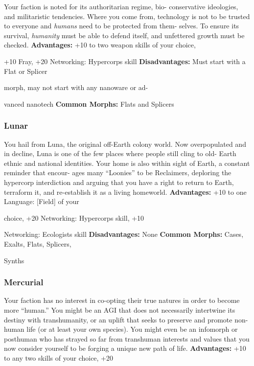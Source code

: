 Your faction is noted for its authoritarian regime, bio-
conservative ideologies, and militaristic tendencies. 
Where you come from, technology is not to be trusted to 
everyone and \textit{humans} need to be protected from them-
selves. To ensure its survival, \textit{humanity }must be able to 
defend itself, and unfettered growth must be checked.
\textbf{Advantages:} +10 to two weapon skills of your choice, 

+10 Fray, +20 Networking: Hypercorps skill
\textbf{Disadvantages:} Must start with a Flat or Splicer 

morph, may not start with any nanoware or ad-

vanced nanotech
\textbf{Common Morphs:} Flats and Splicers

\subsubsection{Lunar}

You hail from Luna, the original off-Earth colony 
world. Now overpopulated and in decline, Luna is 
one of the few places where people still cling to old-
Earth ethnic and national identities. Your home is also 
within sight of Earth, a constant reminder that encour-
ages many ``Loonies'' to be Reclaimers, deploring the 
hypercorp interdiction and arguing that you have a 
right to return to Earth, terraform it, and re-establish 
it as a living homeworld.
\textbf{Advantages:} +10 to one Language: [Field] of your 

choice, +20 Networking: Hypercorps skill, +10 

Networking: Ecologists skill
\textbf{Disadvantages:} None
\textbf{Common Morphs:} Cases, Exalts, Flats, Splicers, 

Synths

\subsubsection{Mercurial}

Your faction has no interest in co-opting their true 
natures in order to become more ``human.'' You might 
be an AGI that does not necessarily intertwine its 
destiny with transhumanity, or an uplift that seeks 
to preserve and promote non-human life (or at least 
your own species). You might even be an infomorph or 
posthuman who has strayed so far from transhuman 
interests and values that you now consider yourself to 
be forging a unique new path of life.
\textbf{Advantages:} +10 to any two skills of your choice, +20 


